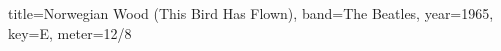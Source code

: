 \documentclass{skrul-leadsheet}
\begin{document}
\begin{song}[transpose-capo=true]{title={Norwegian Wood (This Bird Has Flown)}, band={The Beatles}, year={1965}, key={E}, meter={12/8}}



\end{song}
\end{document}
